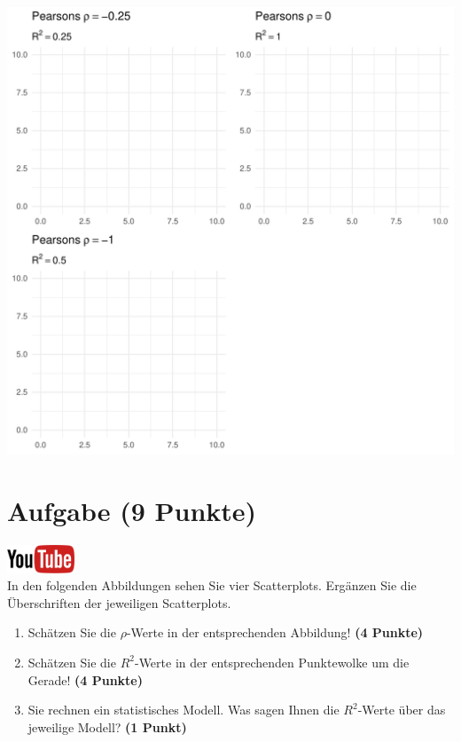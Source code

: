 \documentclass[a4paper, 9pt]{scrartcl}\usepackage[]{graphicx}\usepackage[]{xcolor}
\makeatletter
\def\maxwidth{ %
  \ifdim\Gin@nat@width>\linewidth
    \linewidth
  \else
    \Gin@nat@width
  \fi
}
\makeatother
\begin{document}
{\centering \includegraphics[width=\maxwidth]{img/correlation-01-1} 

}



 
\clearpage

\section{Aufgabe \hfill (9 Punkte)}

\hfill\href{https://youtu.be/2QJa19ZwLls}{\includegraphics[width =
  2cm]{img/youtube}}\\[1Ex]

In den folgenden Abbildungen sehen Sie vier Scatterplots. Erg{\"a}nzen Sie die {\"U}berschriften
der jeweiligen Scatterplots.


\begin{enumerate}
\item Sch{\"a}tzen Sie die $\rho$-Werte in der entsprechenden
  Abbildung! \textbf{(4 Punkte)}
\item Sch{\"a}tzen Sie die $R^2$-Werte in der entsprechenden
  Punktewolke um die Gerade! \textbf{(4 Punkte)}
\item Sie rechnen ein statistisches Modell. Was sagen Ihnen die $R^2$-Werte
  {\"u}ber das jeweilige Modell? \textbf{(1 Punkt)}
\end{enumerate}
\end{document}
